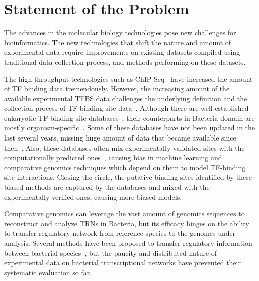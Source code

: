 \section{Statement of the Problem}

The advances in the molecular biology technologies pose new challenges for
bioinformatics. The new technologies that shift the nature and amount of
experimental data require improvements on existing datasets compiled using
traditional data collection process, and methods performing on these datasets.

The high-throughput technologies such as ChIP-Seq~\cite{bailey2013practical}
have increased the amount of TF binding data tremendously. However, the
increasing amount of the available experimental TFBS data challenges the
underlying definition and the collection process of TF-binding site
data~\cite{salgado2013regulondb}. Although there are well-established
eukaryotic TF-binding site databases~\cite{mathelier2015jaspar,
  matys2003transfac}, their counterparts in Bacteria domain are mostly
organism-specific~\cite{salgado2013regulondb, sierro2008dbtbs,
  jacques2005mtbreglist, pauling2012coryneregnet}. Some of these databases have
not been updated in the last several years, missing huge amount of data that
became available since then~\cite{munch2003prodoric}. Also, these databases
often mix experimentally validated sites with the computationally predicted
ones~\cite{kazakov2007regtransbase}, causing bias in machine learning and
comparative genomics techniques which depend on them to model TF-binding site
interactions. Closing the circle, the putative binding sites identified by these
biased methods are captured by the databases and mixed with the
experimentally-verified ones, causing more biased models.

Comparative genomics can leverage the vast amount of genomics sequences to
reconstruct and analyze TRNs in Bacteria, but its efficacy hinges on the
ability to transfer regulatory network from reference species to the genomes
under analysis. Several methods have been proposed to transfer regulatory
information between bacterial species~\cite{babu2009methods,
  baumbach2010power}, but the paucity and distributed nature of experimental
data on bacterial transcriptional networks have prevented their systematic
evaluation so far.

